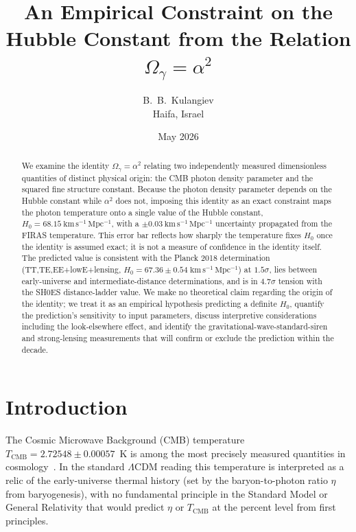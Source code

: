 \documentclass[12pt, a4paper]{article}
\begin{document}
\title{An Empirical Constraint on the Hubble Constant from the Relation \texorpdfstring{$\Omega_\gamma = \alpha^2$}{Omega-gamma = alpha^2}}

\author{B.~B.~Kulangiev\\\small{Haifa, Israel}}
\date{May 2026}
\maketitle

\begin{abstract}
\noindent We examine the identity $\Omega_\gamma = \alpha^2$ relating two independently measured dimensionless quantities of distinct physical origin: the CMB photon density parameter and the squared fine structure constant. Because the photon density parameter depends on the Hubble constant while $\alpha^2$ does not, imposing this identity as an exact constraint maps the photon temperature onto a single value of the Hubble constant, $H_0 = 68.15~\mathrm{km\,s^{-1}\,Mpc^{-1}}$, with a $\pm 0.03~\mathrm{km\,s^{-1}\,Mpc^{-1}}$ uncertainty propagated from the FIRAS temperature. This error bar reflects how sharply the temperature fixes $H_0$ once the identity is assumed exact; it is not a measure of confidence in the identity itself. The predicted value is consistent with the Planck 2018 determination (TT,TE,EE+lowE+lensing, $H_0 = 67.36 \pm 0.54\;\mathrm{km\,s^{-1}\,Mpc^{-1}}$) at $1.5\sigma$, lies between early-universe and intermediate-distance determinations, and is in $4.7\sigma$ tension with the SH0ES distance-ladder value. We make no theoretical claim regarding the origin of the identity; we treat it as an empirical hypothesis predicting a definite $H_0$, quantify the prediction's sensitivity to input parameters, discuss interpretive considerations including the look-elsewhere effect, and identify the gravitational-wave-standard-siren and strong-lensing measurements that will confirm or exclude the prediction within the decade.
\end{abstract}

\section{Introduction}
\label{sec:intro}
The Cosmic Microwave Background (CMB) temperature $T_{\mathrm{CMB}} = 2.72548 \pm 0.00057$~K is among the most precisely measured quantities in cosmology~\cite{fixsen_2009}. In the standard $\Lambda$CDM reading this temperature is interpreted as a relic of the early-universe thermal history (set by the baryon-to-photon ratio $\eta$ from baryogenesis), with no fundamental principle in the Standard Model or General Relativity that would predict $\eta$ or $T_{\mathrm{CMB}}$ at the percent level from first principles.
\end{document}
